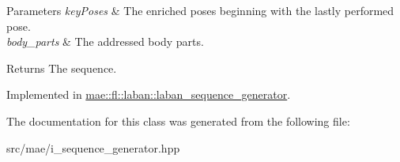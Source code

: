 \begin{DoxyParams}{Parameters}
{\em key\-Poses} & The enriched poses beginning with the lastly performed pose. \\
\hline
{\em body\-\_\-parts} & The addressed body parts. \\
\hline
\end{DoxyParams}
\begin{DoxyReturn}{Returns}
The sequence. 
\end{DoxyReturn}


Implemented in \hyperlink{classmae_1_1fl_1_1laban_1_1laban__sequence__generator_a6311b99a7bf78c2d9779d601ad88353e}{mae\-::fl\-::laban\-::laban\-\_\-sequence\-\_\-generator}.



The documentation for this class was generated from the following file\-:\begin{DoxyCompactItemize}
\item 
src/mae/i\-\_\-sequence\-\_\-generator.\-hpp\end{DoxyCompactItemize}
